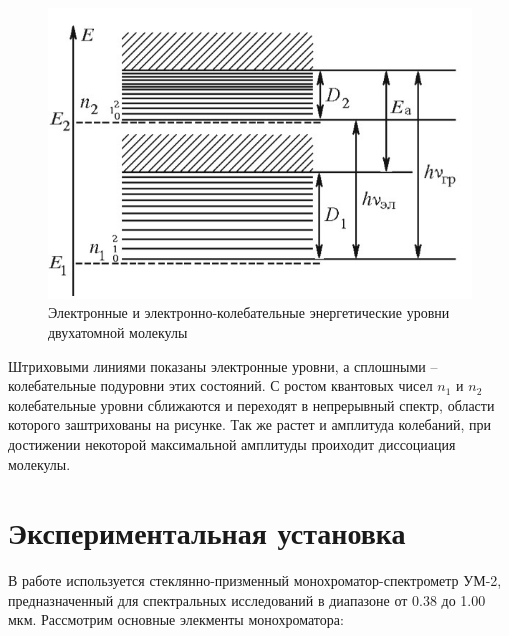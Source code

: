 \documentclass[14pt, a4paper]{report}
\begin{document}
\begin{figure}[H]
\centering
\includegraphics[scale=0.5]{../images/523-6}
\caption{Электронные и электронно-колебательные энергетические уровни двухатомной молекулы}
\end{figure}

Штриховыми линиями показаны электронные уровни, а сплошными -- колебательные подуровни этих состояний. С ростом квантовых чисел  $n_1$ и $n_2$ колебательные уровни сближаются и переходят в непрерывный спектр, области которого заштрихованы на рисунке. Так же растет и амплитуда колебаний, при достижении некоторой максимальной амплитуды проиходит диссоциация молекулы.

\section{Экспериментальная установка}

В работе используется стеклянно-призменный монохроматор-спектрометр УМ-2, предназначенный для спектральных исследований в диапазоне от 0.38 до 1.00 мкм. Рассмотрим основные элекменты монохроматора:
\end{document}

